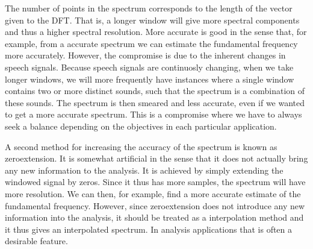 \documentclass[letterpaper,10pt,english]{jupyterBook}
\begin{document}
\sphinxAtStartPar
The number of points in the spectrum corresponds to the length of the vector given to the DFT. That is, a longer window will give more spectral components and thus a higher spectral resolution. More accurate is good in the sense that, for example, from a accurate spectrum we can estimate the fundamental frequency more accurately. However, the compromise is due to the inherent changes in speech signals. Because speech signals are continuosly changing, when we take longer windows, we will more frequently have instances where a single window contains two or more distinct sounds, such that the spectrum is a combination of these sounds. The spectrum is then smeared and less accurate, even if we wanted to get a more accurate spectrum. This is a compromise where we have to always seek a balance depending on the objectives in each particular application.

\sphinxAtStartPar
A second method for increasing the accuracy of the spectrum is known as zero\sphinxhyphen{}extension. It is somewhat artificial in the sense that it does not actually bring any new information to the analysis. It is achieved by simply extending the windowed signal by zeros. Since it thus has more samples, the spectrum will have more resolution. We can then, for example, find a more accurate estimate of the fundamental frequency. However, since zero\sphinxhyphen{}extension does not introduce any new information into the analysis, it should be treated as a interpolation method and it thus gives an interpolated spectrum. In analysis applications that is often a desirable feature.
\end{document}
